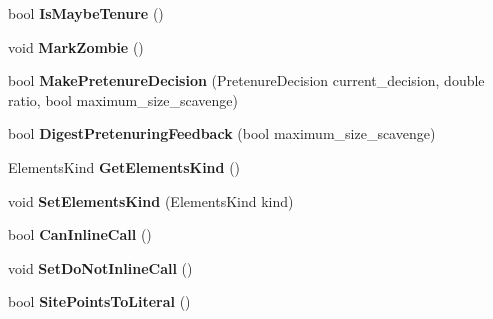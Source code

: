 \begin{DoxyCompactItemize}
\item 
bool {\bfseries Is\+Maybe\+Tenure} ()\hypertarget{classv8_1_1internal_1_1_allocation_site_aa1870a70bef3585f613d95509e3c026e}{}\label{classv8_1_1internal_1_1_allocation_site_aa1870a70bef3585f613d95509e3c026e}

\item 
void {\bfseries Mark\+Zombie} ()\hypertarget{classv8_1_1internal_1_1_allocation_site_af432e0790ebdfc00d36c9a6234e98389}{}\label{classv8_1_1internal_1_1_allocation_site_af432e0790ebdfc00d36c9a6234e98389}

\item 
bool {\bfseries Make\+Pretenure\+Decision} (Pretenure\+Decision current\+\_\+decision, double ratio, bool maximum\+\_\+size\+\_\+scavenge)\hypertarget{classv8_1_1internal_1_1_allocation_site_ac56e44521833202855156f6c8f06101f}{}\label{classv8_1_1internal_1_1_allocation_site_ac56e44521833202855156f6c8f06101f}

\item 
bool {\bfseries Digest\+Pretenuring\+Feedback} (bool maximum\+\_\+size\+\_\+scavenge)\hypertarget{classv8_1_1internal_1_1_allocation_site_ab06a9db3e9fa8256f8cd97cc5cefeff5}{}\label{classv8_1_1internal_1_1_allocation_site_ab06a9db3e9fa8256f8cd97cc5cefeff5}

\item 
Elements\+Kind {\bfseries Get\+Elements\+Kind} ()\hypertarget{classv8_1_1internal_1_1_allocation_site_ad32f0453a6a51c271b6207227ec2959d}{}\label{classv8_1_1internal_1_1_allocation_site_ad32f0453a6a51c271b6207227ec2959d}

\item 
void {\bfseries Set\+Elements\+Kind} (Elements\+Kind kind)\hypertarget{classv8_1_1internal_1_1_allocation_site_adf1136948311998f7ead14bcf8f2cfd8}{}\label{classv8_1_1internal_1_1_allocation_site_adf1136948311998f7ead14bcf8f2cfd8}

\item 
bool {\bfseries Can\+Inline\+Call} ()\hypertarget{classv8_1_1internal_1_1_allocation_site_aeb29ad379adc7425340ae3b2e38f72f3}{}\label{classv8_1_1internal_1_1_allocation_site_aeb29ad379adc7425340ae3b2e38f72f3}

\item 
void {\bfseries Set\+Do\+Not\+Inline\+Call} ()\hypertarget{classv8_1_1internal_1_1_allocation_site_a3e9fcf250995d87d2c31e05c6e4e6ce5}{}\label{classv8_1_1internal_1_1_allocation_site_a3e9fcf250995d87d2c31e05c6e4e6ce5}

\item 
bool {\bfseries Site\+Points\+To\+Literal} ()\hypertarget{classv8_1_1internal_1_1_allocation_site_adca3580eb9a8d18cf1becc2b9a1995bb}{}\label{classv8_1_1internal_1_1_allocation_site_adca3580eb9a8d18cf1becc2b9a1995bb}

\end{DoxyCompactItemize}
